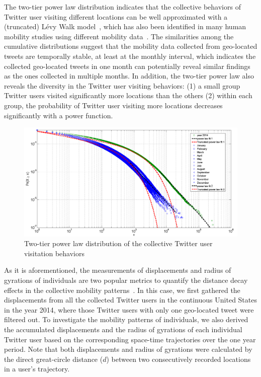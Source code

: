 \documentclass[ijgi,article,accept,moreauthors,pdftex,10pt,a4paper]{mdpi}
\theoremstyle{mdpi}
\newcounter{ex}
\newcounter{re}
\theoremstyle{mdpidefinition}
\begin{document}
The two-tier power law distribution indicates that the collective behaviors of Twitter user visiting different locations can be well approximated with a (truncated) L\'{e}vy Walk model~\cite{ reynolds2012truncated, rhee2011levy}, which has also been identified in many human mobility studies using different mobility data~\cite{zhao2015explaining}.
The similarities among the cumulative distributions suggest that the mobility data collected from geo-located tweets are temporally stable, at least at the monthly interval, which indicates the collected geo-located tweets in one month can potentially reveal similar findings as the ones collected in multiple months.
In addition, the two-tier power law also reveals the diversity in the Twitter user visiting behaviors: (1) a small group Twitter users visited significantly more locations than the others (2) within each group, the probability of Twitter user visiting more locations decreases significantly with a power function.

\begin{figure}[ht]
\centering
\includegraphics[width=1.0\linewidth]{./figures/visitation}
\caption{Two-tier power law distribution of the collective Twitter user visitation behaviors}
\label{fig:visitation}
\end{figure}
\FloatBarrier

As it is aforementioned, the measurements of displacements and radius of gyrations of individuals are two popular metrics to quantify the distance decay effects in the collective mobility patterns~\cite{gonzalez2008understanding}.
In this case, we first gathered the displacements from all the collected Twitter users in the continuous United States in the year 2014, where those Twitter users with only one geo-located tweet were filtered out. 
To investigate the mobility patterns of individuals, we also derived the accumulated displacements and the radius of gyrations of each individual Twitter user based on the corresponding space-time trajectories over the one year period.
Note that both displacements and radius of gyrations were calculated by the direct great-circle distance ($d$) between two consecutively recorded locations in a user's trajectory.
\end{document}
